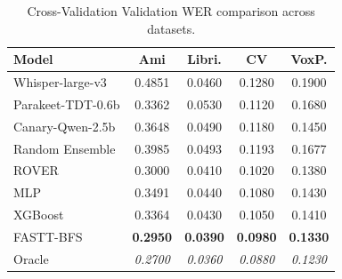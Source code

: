 \begin{table}[t]
\centering
\caption{Cross-Validation Validation WER comparison across datasets.}
\label{tab:cv_val_wer}
\small
\begin{tabular}{lcccc}
\toprule
\textbf{Model} & Ami & Libri. & CV & VoxP. \\
\midrule
Whisper-large-v3 & 0.4851 & 0.0460 & 0.1280 & 0.1900 \\
Parakeet-TDT-0.6b & 0.3362 & 0.0530 & 0.1120 & 0.1680 \\
Canary-Qwen-2.5b & 0.3648 & 0.0490 & 0.1180 & 0.1450 \\
Random Ensemble & 0.3985 & 0.0493 & 0.1193 & 0.1677 \\
ROVER & 0.3000 & 0.0410 & 0.1020 & 0.1380 \\
MLP & 0.3491 & 0.0440 & 0.1080 & 0.1430 \\
XGBoost & 0.3364 & 0.0430 & 0.1050 & 0.1410 \\
FASTT-BFS & \textbf{0.2950} & \textbf{0.0390} & \textbf{0.0980} & \textbf{0.1330} \\
Oracle & \textit{0.2700} & \textit{0.0360} & \textit{0.0880} & \textit{0.1230} \\
\bottomrule
\end{tabular}
\end{table}
